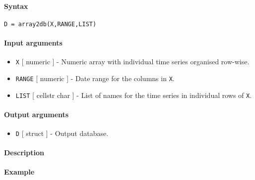 


	\paragraph{Syntax}\label{syntax}

\begin{verbatim}
D = array2db(X,RANGE,LIST)
\end{verbatim}

\paragraph{Input arguments}\label{input-arguments}

\begin{itemize}
\item
  \texttt{X} {[} numeric {]} - Numeric array with individual time series
  organised row-wise.
\item
  \texttt{RANGE} {[} numeric {]} - Date range for the columns in
  \texttt{X}.
\item
  \texttt{LIST} {[} cellstr \textbar{} char {]} - List of names for the
  time series in individual rows of \texttt{X}.
\end{itemize}

\paragraph{Output arguments}\label{output-arguments}

\begin{itemize}
\itemsep1pt\parskip0pt
\item
  \texttt{D} {[} struct {]} - Output database.
\end{itemize}

\paragraph{Description}\label{description}

\paragraph{Example}\label{example}


